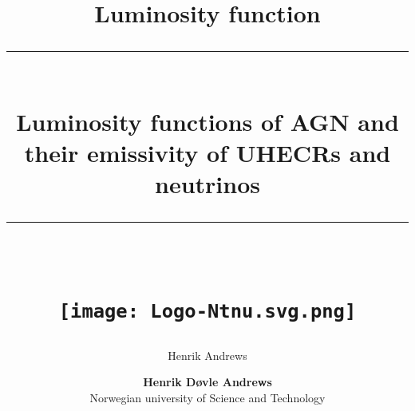 \documentclass[11pt]{article}
\title{Luminosity function}
\author{Henrik Andrews}
\newcommand{\HRule}[1]{\rule{\linewidth}{#1}}
\begin{document}
\title{ \normalsize
	\HRule{0.5pt} \\
	\LARGE \textbf{{Luminosity functions of AGN and their emissivity of UHECRs and neutrinos}}	
	\\
	\HRule{2pt} \\ [0.5cm]		
	\vspace{6cm}
	\begin{figure}[htp]
    \centering
    \texttt{[image: Logo-Ntnu.svg.png]}
    \end{figure}
	}

\author{
    \normalsize 
	\textbf{Henrik Døvle Andrews } \\
	Norwegian university of Science and Technology \\ 
}

\maketitle
\setcounter{page}{ 0 }

\newpage

\pagestyle{fancy}
\fancyhf{}
\setlength\headheight{14pt}
\setcounter{page}{1}


\maketitle
\end{document}
